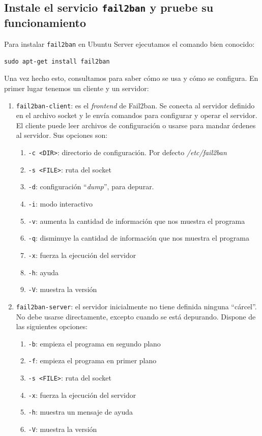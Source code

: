 \documentclass[10pt,a4paper,spanish]{article}
\numberwithin{equation}{section} %
\numberwithin{figure}{section} %
\numberwithin{table}{section} %
\begin{document}
\subsection{Instale el servicio \texttt{fail2ban} y pruebe su funcionamiento}
Para instalar \texttt{fail2ban} en Ubuntu Server ejecutamos el comando bien conocido:
\begin{verbatim}
sudo apt-get install fail2ban    
\end{verbatim}

Una vez hecho esto, consultamos \cite{fail2banwiki} para saber cómo se usa y cómo se configura. En primer lugar tenemos un cliente y un servidor:
\begin{enumerate}[---]
    \item \texttt{fail2ban-client}: es el \textit{frontend} de Fail2ban. Se conecta al servidor definido en el archivo socket y le envía comandos para configurar y operar el servidor. El cliente puede leer archivos de configuración o usarse para mandar órdenes al servidor. Sus opciones son:
    \begin{enumerate}[$\bullet$]
        \item \texttt{-c <DIR>}: directorio de configuración. Por defecto \textit{/etc/fail2ban}
        \item \texttt{-s <FILE>}: ruta del socket
        \item \texttt{-d}: configuración ``\textit{dump}'', para depurar.
        \item \texttt{-i}: modo interactivo
        \item \texttt{-v}: aumenta la cantidad de información que nos muestra el programa
        \item \texttt{-q}: disminuye la cantidad de información que nos muestra el programa
        \item \texttt{-x}: fuerza la ejecución del servidor
        \item \texttt{-h}: ayuda
        \item \texttt{-V}: muestra la versión
    \end{enumerate}
    \item \texttt{fail2ban-server}: el servidor inicialmente no tiene definida ninguna ``cárcel''. No debe usarse directamente, excepto cuando se está depurando. Dispone de las siguientes opciones:
    \begin{enumerate}[$\bullet$]
        \item \texttt{-b}: empieza el programa en segundo plano
        \item \texttt{-f}: empieza el programa en primer plano
        \item \texttt{-s <FILE>}: ruta del socket
        \item \texttt{-x}: fuerza la ejecución del servidor
        \item \texttt{-h}: muestra un mensaje de ayuda
        \item \texttt{-V}: muestra la versión
    \end{enumerate}
\end{enumerate}
\end{document}
